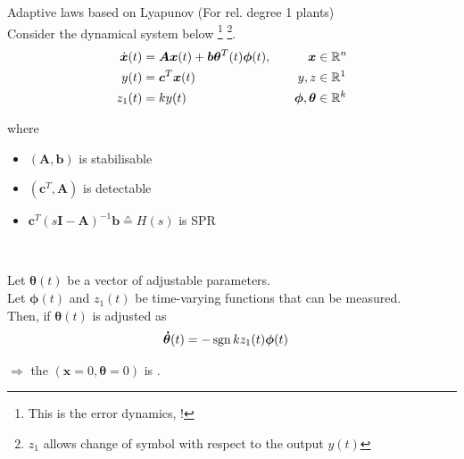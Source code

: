 \begin{lemma}{Adaptive laws based on Lyapunov}
(For rel. degree 1 plants)\\
Consider the dynamical system below%
\footnote{This is the error dynamics, !}%
\footnote{$z_1$ allows change of symbol with respect to the output $y(t)$}.
\begin{alignat*}{3}
\dot{\bm{x}}(t) &= \bm{A} \bm{x}(t) + \bm{b} \bm{\theta}^T(t) \bm{\phi}(t), \quad &\bm{x} &\in \mathbb{R}^n\\
y(t) &= \bm{c}^T \bm{x}(t)      & y, z &\in \mathbb{R}^1\\
z_1(t) &= k y(t)      & \bm{\phi}, \bm{\theta} &\in \mathbb{R}^k
\end{alignat*}

where
\begin{itemize}
\item $(\bm{A}, \bm{b})$ is stabilisable
\item $(\bm{c}^T, \bm{A})$ is detectable
\item $\bm{c}^T \left( s \bm{I} - \bm{A} \right)^{-1} \bm{b} \corresponds H(s)$
    is SPR
\end{itemize}~

Let $\bm{\theta}(t)$ be a vector of adjustable parameters.\\
Let $\bm{\phi}(t)$ and $z_1(t)$ be time-varying functions that can be measured.\\

Then, if $\bm{\theta}(t)$ is adjusted as
\begin{alignat}{3}
\bm{\dot{\theta}}(t) &= - \operatorname{sgn}{k} z_1(t) \bm{\phi}(t)
\label{eq:adaptive-law-multistate}
\end{alignat}

$\Rightarrow$ the  $\left( \bm{x}=0, \bm{\theta}=0 \right)$ 
is .
\end{lemma}
